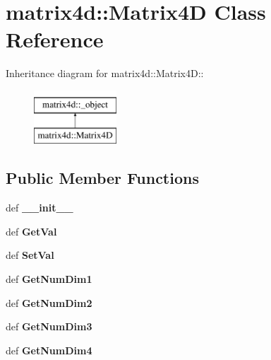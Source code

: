 \hypertarget{classmatrix4d_1_1Matrix4D}{
\section{matrix4d::Matrix4D Class Reference}
\label{d8/d2d/classmatrix4d_1_1Matrix4D}
}
Inheritance diagram for matrix4d::Matrix4D::\begin{figure}[H]
\begin{center}
\leavevmode
\includegraphics[height=2cm]{d8/d2d/classmatrix4d_1_1Matrix4D}
\end{center}
\end{figure}
\subsection*{Public Member Functions}
\begin{DoxyCompactItemize}
\item 
\hypertarget{classmatrix4d_1_1Matrix4D_aa8d774229c413810f9b45e3f9639e14a}{
def {\bfseries \_\-\_\-init\_\-\_\-}}
\label{d8/d2d/classmatrix4d_1_1Matrix4D_aa8d774229c413810f9b45e3f9639e14a}

\item 
\hypertarget{classmatrix4d_1_1Matrix4D_a6fafbf238ef7c28349d531f83fd8cf33}{
def {\bfseries GetVal}}
\label{d8/d2d/classmatrix4d_1_1Matrix4D_a6fafbf238ef7c28349d531f83fd8cf33}

\item 
\hypertarget{classmatrix4d_1_1Matrix4D_a2b5889d9f828b99718de148fca1be9f9}{
def {\bfseries SetVal}}
\label{d8/d2d/classmatrix4d_1_1Matrix4D_a2b5889d9f828b99718de148fca1be9f9}

\item 
\hypertarget{classmatrix4d_1_1Matrix4D_a3f9d959c9d4c8d5320747d7ee04c9fec}{
def {\bfseries GetNumDim1}}
\label{d8/d2d/classmatrix4d_1_1Matrix4D_a3f9d959c9d4c8d5320747d7ee04c9fec}

\item 
\hypertarget{classmatrix4d_1_1Matrix4D_a95aa43f9651d99efa51c414cbde29838}{
def {\bfseries GetNumDim2}}
\label{d8/d2d/classmatrix4d_1_1Matrix4D_a95aa43f9651d99efa51c414cbde29838}

\item 
\hypertarget{classmatrix4d_1_1Matrix4D_af60a9f91fa2c528f76bea466db63dd12}{
def {\bfseries GetNumDim3}}
\label{d8/d2d/classmatrix4d_1_1Matrix4D_af60a9f91fa2c528f76bea466db63dd12}

\item 
\hypertarget{classmatrix4d_1_1Matrix4D_ad1da489a0f84e1092e77a7586c03a062}{
def {\bfseries GetNumDim4}}
\label{d8/d2d/classmatrix4d_1_1Matrix4D_ad1da489a0f84e1092e77a7586c03a062}

\end{DoxyCompactItemize}
